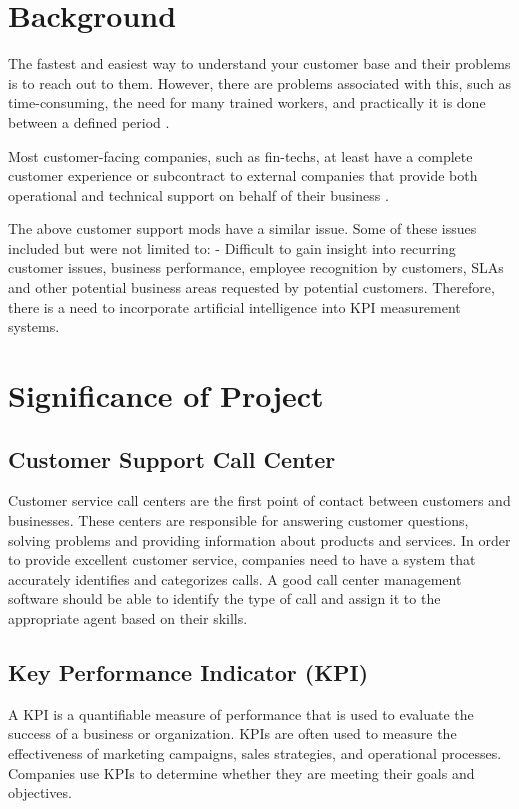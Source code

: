 \documentclass[conference]{IEEEtran}
\begin{document}
\section{Background}
The fastest and easiest way to understand your customer base and their problems is to reach out to them. However, there are problems associated with this, such as time-consuming, the need for many trained workers, and practically it is done between a defined period \cite{b14}.

Most customer-facing companies, such as fin-techs, at least have a complete customer experience or subcontract to external companies that provide both operational and technical support on behalf of their business \cite{b13}.

The above customer support mods have a similar issue. Some of these issues included but were not limited to: - Difficult to gain insight into recurring customer issues, business performance, employee recognition by customers, SLAs and other potential business areas requested by potential customers. Therefore, there is a need to incorporate artificial intelligence into KPI measurement systems.

\section{Significance of Project}

\subsection{Customer Support Call Center}
Customer service call centers are the first point of contact between customers and businesses. These centers are responsible for answering customer questions, solving problems and providing information about products and services. In order to provide excellent customer service, companies need to have a system that accurately identifies and categorizes calls. A good call center management software should be able to identify the type of call and assign it to the appropriate agent based on their skills.

\subsection{Key Performance Indicator (KPI)}
A KPI is a quantifiable measure of performance that is used to evaluate the success of a business or organization. KPIs are often used to measure the effectiveness of marketing campaigns, sales strategies, and operational processes. Companies use KPIs to determine whether they are meeting their goals and objectives.
\end{document}
